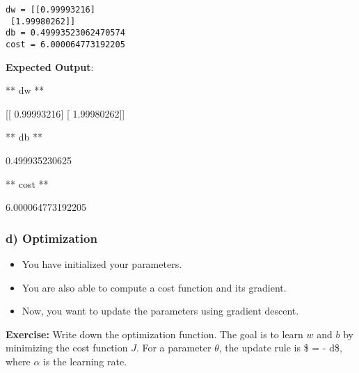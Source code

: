 \documentclass[11pt]{article}
\providecommand{\tightlist}{%
      \setlength{\itemsep}{0pt}\setlength{\parskip}{0pt}}
\begin{document}
    \begin{Verbatim}[commandchars=\\\{\}]
dw = [[0.99993216]
 [1.99980262]]
db = 0.49993523062470574
cost = 6.000064773192205

    \end{Verbatim}

    \textbf{Expected Output}:

** dw **

{[}{[} 0.99993216{]} {[} 1.99980262{]}{]}

** db **

0.499935230625

** cost **

6.000064773192205

    \hypertarget{d-optimization}{%
\subsubsection{d) Optimization}\label{d-optimization}}

\begin{itemize}
\tightlist
\item
  You have initialized your parameters.
\item
  You are also able to compute a cost function and its gradient.
\item
  Now, you want to update the parameters using gradient descent.
\end{itemize}

\textbf{Exercise:} Write down the optimization function. The goal is to
learn \(w\) and \(b\) by minimizing the cost function \(J\). For a
parameter \(\theta\), the update rule is \$ \theta = \theta -
\alpha \text{ } d\theta\$, where \(\alpha\) is the learning rate.
\end{document}
